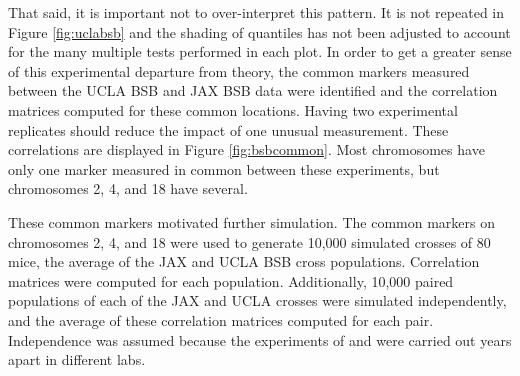\documentclass[sts]{imsart}
\begin{document}
That said, it is important not to over-interpret this pattern. It is not repeated in Figure \ref{fig:uclabsb} and the shading of quantiles has not been adjusted to account for the many multiple tests performed in each plot. In order to get a greater sense of this experimental departure from theory, the common markers measured between the UCLA BSB and JAX BSB data were identified and the correlation matrices computed for these common locations. Having two experimental replicates should reduce the impact of one unusual measurement. These correlations are displayed in Figure \ref{fig:bsbcommon}. Most chromosomes have only one marker measured in common between these experiments, but chromosomes 2, 4, and 18 have several.

These common markers motivated further simulation. The common markers on chromosomes 2, 4, and 18 were used to generate 10,000 simulated crosses of 80 mice, the average of the JAX and UCLA BSB cross populations. Correlation matrices were computed for each population. Additionally, 10,000 paired populations of each of the JAX and UCLA crosses were simulated independently, and the average of these correlation matrices computed for each pair. Independence was assumed because the experiments of \cite{roweetal1994jaxbsb} and \cite{welchetal1996uclabsb} were carried out years apart in different labs.
\end{document}
